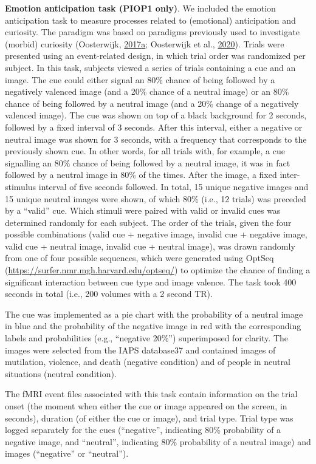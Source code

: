 \documentclass[12pt,american,a4paper,oneside,]{memoir} %
\begin{document}
\textbf{Emotion anticipation task (PIOP1 only)}. We included the emotion anticipation task to measure processes related to (emotional) anticipation and curiosity. The paradigm was based on paradigms previously used to investigate (morbid) curiosity (Oosterwijk, \protect\hyperlink{ref-oosterwijk2017choosing}{2017}\protect\hyperlink{ref-oosterwijk2017choosing}{a}; Oosterwijk et al., \protect\hyperlink{ref-Oosterwijk2020-uf}{2020}). Trials were presented using an event-related design, in which trial order was randomized per subject. In this task, subjects viewed a series of trials containing a cue and an image. The cue could either signal an 80\% chance of being followed by a negatively valenced image (and a 20\% chance of a neutral image) or an 80\% chance of being followed by a neutral image (and a 20\% change of a negatively valenced image). The cue was shown on top of a black background for 2 seconds, followed by a fixed interval of 3 seconds. After this interval, either a negative or neutral image was shown for 3 seconds, with a frequency that corresponds to the previously shown cue. In other words, for all trials with, for example, a cue signalling an 80\% chance of being followed by a neutral image, it was in fact followed by a neutral image in 80\% of the times. After the image, a fixed inter-stimulus interval of five seconds followed. In total, 15 unique negative images and 15 unique neutral images were shown, of which 80\% (i.e., 12 trials) was preceded by a ``valid'' cue. Which stimuli were paired with valid or invalid cues was determined randomly for each subject. The order of the trials, given the four possible combinations (valid cue + negative image, invalid cue + negative image, valid cue + neutral image, invalid cue + neutral image), was drawn randomly from one of four possible sequences, which were generated using OptSeq (\url{https://surfer.nmr.mgh.harvard.edu/optseq/}) to optimize the chance of finding a significant interaction between cue type and image valence. The task took 400 seconds in total (i.e., 200 volumes with a 2 second TR).

The cue was implemented as a pie chart with the probability of a neutral image in blue and the probability of the negative image in red with the corresponding labels and probabilities (e.g., ``negative 20\%'') superimposed for clarity. The images were selected from the IAPS database37 and contained images of mutilation, violence, and death (negative condition) and of people in neutral situations (neutral condition).

The fMRI event files associated with this task contain information on the trial onset (the moment when either the cue or image appeared on the screen, in seconds), duration (of either the cue or image), and trial type. Trial type was logged separately for the cues (``negative'', indicating 80\% probability of a negative image, and ``neutral'', indicating 80\% probability of a neutral image) and images (``negative'' or ``neutral'').
\end{document}
